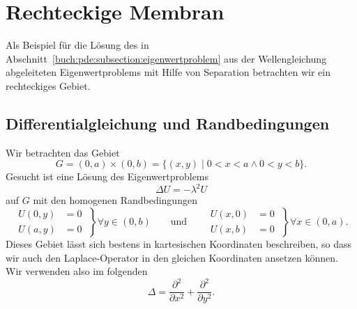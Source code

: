 %
%
%
\section{Rechteckige Membran
\label{buch:pde:section:rechteck}}
Als Beispiel für die Lösung des in
Abschnitt~\ref{buch:pde:subsection:eigenwertproblem}
aus der Wellengleichung abgeleiteten Eigenwertproblems
mit Hilfe von Separation betrachten wir ein rechteckiges Gebiet.

%
%
\subsection{Differentialgleichung und Randbedingungen}
Wir betrachten das Gebiet
\[
G
=
(0,a) \times (0,b) 
=
\{ (x,y) \mid 0< x <a\wedge 0<y<b\}.
\]
Gesucht ist eine Lösung des Eigenwertproblems
\begin{equation}
\Delta U = -\lambda^2 U
\label{buch:pde:rechteck:eqn:dgl}
\end{equation}
auf $G$ mit den homogenen Randbedingungen
\[
\left.
\begin{aligned}
U(0,y) &= 0\\
U(a,y) &= 0
\end{aligned}
\;
\right\}
\forall y \in (0,b)
\qquad
\text{und}
\qquad
\left.
\begin{aligned}
U(x,0) &= 0\\
U(x,b) &= 0
\end{aligned}
\;
\right\}
\forall x \in (0,a).
\]
Dieses Gebiet lässt sich bestens in kartesischen Koordinaten
beschreiben, so dass wir auch den Laplace-Operator in den
gleichen Koordinaten ansetzen können.
Wir verwenden also im folgenden
\[
\Delta = \frac{\partial^2}{\partial x^2} + \frac{\partial^2}{\partial y^2}.
\]

%
%
